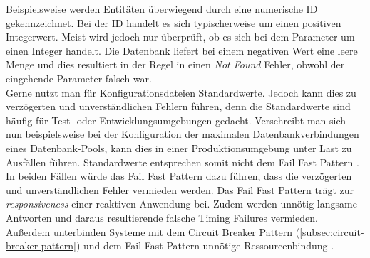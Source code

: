 Beispielsweise werden Entitäten überwiegend durch eine numerische ID gekennzeichnet. Bei der ID handelt es sich typischerweise um einen positiven Integerwert. Meist wird jedoch nur überprüft, ob es sich bei dem Parameter um einen Integer handelt. Die Datenbank liefert bei einem negativen Wert eine leere Menge und dies resultiert in der Regel in einen \textit{Not Found} Fehler, obwohl der eingehende Parameter falsch war.\\
Gerne nutzt man für Konfigurationsdateien Standardwerte. Jedoch kann dies zu verzögerten und unverständlichen Fehlern führen, denn die Standardwerte sind häufig für Test- oder Entwicklungsumgebungen gedacht. Verschreibt man sich nun beispielsweise bei der Konfiguration der maximalen Datenbankverbindungen eines Datenbank-Pools, kann dies in einer Produktionsumgebung unter Last zu Ausfällen führen. Standardwerte entsprechen somit nicht dem Fail Fast Pattern \cite{shore_fail_2004}.\\

In beiden Fällen würde das Fail Fast Pattern dazu führen, dass die verzögerten und unverständlichen Fehler vermieden werden. Das Fail Fast Pattern trägt zur \textit{responsiveness} einer reaktiven Anwendung bei. Zudem werden unnötig langsame Antworten und daraus resultierende falsche Timing Failures vermieden. Außerdem unterbinden Systeme mit dem Circuit Breaker Pattern (\ref{subsec:circuit-breaker-pattern}) und dem Fail Fast Pattern unnötige Ressourcenbindung \cite[S.~107]{nygard_release_2007}.

\pagebreak

